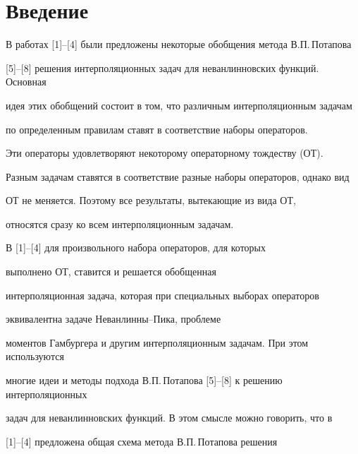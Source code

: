 

\maketitle


\label{begin}








\section{Введение}





В работах [1]--[4] были предложены некоторые обобщения метода В.П.\,Потапова


[5]--[8] решения интерполяционных задач для неванлинновских функций. Основная


идея этих обобщений состоит в том, что различным интерполяционным задачам


по определенным правилам ставят в соответствие наборы операторов.


Эти операторы удовлетворяют некоторому операторному тождеству (ОТ).


Разным задачам ставятся в соответствие разные наборы операторов, однако вид


ОТ не меняется. Поэтому все результаты, вытекающие из вида ОТ,


относятся сразу ко всем интерполяционным задачам.





В [1]--[4] для произвольного набора операторов, для которых


выполнено ОТ, ставится и решается обобщенная


интерполяционная задача, которая при специальных выборах операторов


эквивалентна задаче Неванлинны--Пика, проблеме


моментов Гамбургера и другим интерполяционным задачам. При этом используются


многие идеи и методы подхода В.П.\,Потапова [5]--[8] к решению интерполяционных


задач для неванлинновских функций. В этом смысле можно говорить, что в


[1]--[4] предложена общая схема метода В.П.\,Потапова решения


